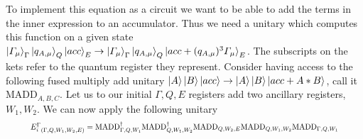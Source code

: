 To implement this equation as a circuit we want to be able to add the terms in the inner expression to an accumulator. 
Thus we need a unitary which computes this function on a given state $\ket{\varGamma_\mu}_\Gamma\ket{q_{A,\mu}}_Q\ket{acc}_E \to \ket{\varGamma_\mu}_\Gamma\ket{q_{A,\mu}}_Q\ket{acc+(q_{A,\mu})^3\varGamma_{\mu}}_E$. The subscripts on the kets refer to the quantum register they represent. 
Consider having access to the following fused multiply add unitary $\ket{A}\ket{B}\ket{acc} \to \ket{A}\ket{B}\ket{acc+A*B}$, call it $\text{MADD}_{A,B,C}$. 
Let us to our initial $\Gamma, Q, E$ registers add two ancillary registers, $W_1,W_2$. 
We can now apply the following unitary 
\begin{equation}
    \resizebox{.9\hsize}{!}{${E_i^\Gamma}_{(\Gamma,Q,W_1,W_2,E)} = \text{MADD}^\dagger_{\Gamma,Q,W_1}\text{MADD}^\dagger_{Q,W_1,W_2}\text{MADD}_{Q,W_2,E}\text{MADD}_{Q,W_1,W_2}\text{MADD}_{\Gamma,Q,W_1}$}
    \label{EiG}
\end{equation}
